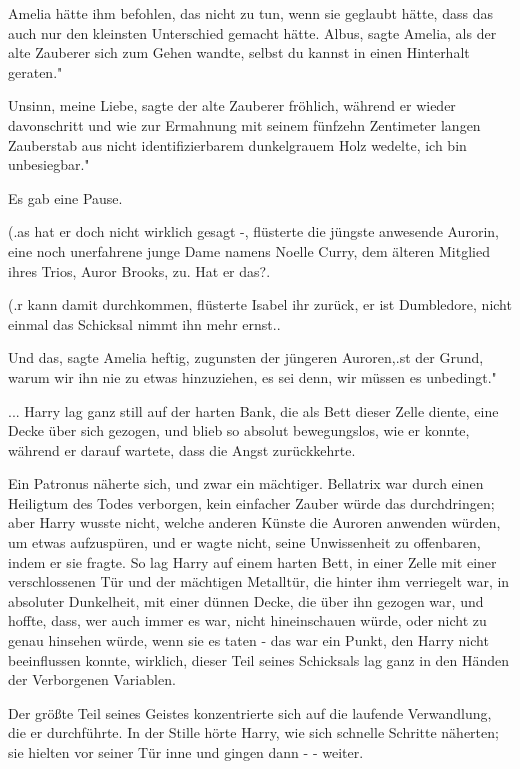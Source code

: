 Amelia hätte ihm befohlen, das nicht zu tun, wenn sie geglaubt hätte, dass das
auch nur den kleinsten Unterschied gemacht hätte. \glqq Albus\grqq{}, sagte
Amelia, als der alte Zauberer sich zum Gehen wandte, \glqq selbst du kannst in
einen Hinterhalt geraten."

\glqq Unsinn, meine Liebe\grqq{}, sagte der alte Zauberer fröhlich, während er
wieder davonschritt und wie zur Ermahnung mit seinem fünfzehn Zentimeter langen
Zauberstab aus nicht identifizierbarem dunkelgrauem Holz wedelte, \glqq ich bin
unbesiegbar."

Es gab eine Pause.

(\grqq{}.as hat er doch nicht wirklich gesagt -\grqq{}, flüsterte die jüngste
anwesende Aurorin, eine noch unerfahrene junge Dame namens Noelle Curry, dem
älteren Mitglied ihres Trios, Auror Brooks, zu. \glqq Hat er das?\grqq{}.

(\grqq{}.r kann damit durchkommen\grqq{}, flüsterte Isabel ihr zurück, \glqq er
ist Dumbledore, nicht einmal das Schicksal nimmt ihn mehr ernst.\grqq{}.

\glqq Und das\grqq{}, sagte Amelia heftig, zugunsten der jüngeren
Auroren,\grqq{}.st der Grund, warum wir ihn nie zu etwas hinzuziehen, es sei
denn, wir müssen es unbedingt."

... Harry lag ganz still auf der harten Bank, die als Bett dieser Zelle diente,
eine Decke über sich gezogen, und blieb so absolut bewegungslos, wie er konnte,
während er darauf wartete, dass die Angst zurückkehrte.

Ein Patronus näherte sich, und zwar ein mächtiger. Bellatrix war durch einen
Heiligtum des Todes verborgen, kein einfacher Zauber würde das durchdringen;
aber Harry wusste nicht, welche anderen Künste die Auroren anwenden würden, um
etwas aufzuspüren, und er wagte nicht, seine Unwissenheit zu offenbaren, indem
er sie fragte. So lag Harry auf einem harten Bett, in einer Zelle mit einer
verschlossenen Tür und der mächtigen Metalltür, die hinter ihm verriegelt war,
in absoluter Dunkelheit, mit einer dünnen Decke, die über ihn gezogen war, und
hoffte, dass, wer auch immer es war, nicht hineinschauen würde, oder nicht zu
genau hinsehen würde, wenn sie es taten - das war ein Punkt, den Harry nicht
beeinflussen konnte, wirklich, dieser Teil seines Schicksals lag ganz in den
Händen der Verborgenen Variablen.

Der größte Teil seines Geistes konzentrierte sich auf die laufende Verwandlung,
die er durchführte. In der Stille hörte Harry, wie sich schnelle Schritte
näherten; sie hielten vor seiner Tür inne und gingen dann - - weiter.

